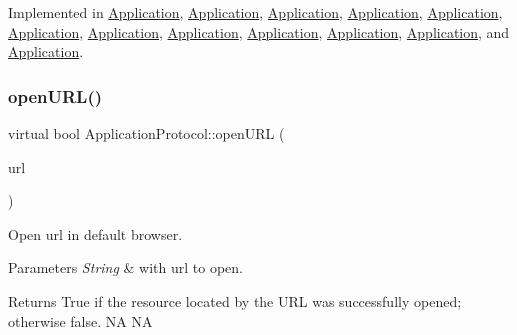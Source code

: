 Implemented in \hyperlink{classApplication_a13ccf5ab932de8a22255b56d085bed59}{Application}, \hyperlink{classApplication_a13ccf5ab932de8a22255b56d085bed59}{Application}, \hyperlink{classApplication_a13ccf5ab932de8a22255b56d085bed59}{Application}, \hyperlink{classApplication_a13ccf5ab932de8a22255b56d085bed59}{Application}, \hyperlink{classApplication_a13ccf5ab932de8a22255b56d085bed59}{Application}, \hyperlink{classApplication_a7efe73e7593e558749052d9decedf693}{Application}, \hyperlink{classApplication_a13ccf5ab932de8a22255b56d085bed59}{Application}, \hyperlink{classApplication_a72b67fcc1ab0875ee67a95167c76db61}{Application}, \hyperlink{classApplication_ab77675704c2cec7b0ed8413f4d556562}{Application}, \hyperlink{classApplication_a13ccf5ab932de8a22255b56d085bed59}{Application}, \hyperlink{classApplication_a72b67fcc1ab0875ee67a95167c76db61}{Application}, and \hyperlink{classApplication_a72b67fcc1ab0875ee67a95167c76db61}{Application}.

\mbox{\label{classApplicationProtocol_a152a977b301a90253ec5a6533b2e8e04}} 
\subsubsection{\texorpdfstring{open\+U\+R\+L()}{openURL()}\hspace{0.1cm}{\footnotesize\ttfamily [2/2]}}
{\footnotesize\ttfamily virtual bool Application\+Protocol\+::open\+U\+RL (\begin{DoxyParamCaption}\item[{const std\+::string \&}]{url }\end{DoxyParamCaption})\hspace{0.3cm}{\ttfamily [pure virtual]}}



Open url in default browser. 


\begin{DoxyParams}{Parameters}
{\em String} & with url to open. \\
\hline
\end{DoxyParams}
\begin{DoxyReturn}{Returns}
True if the resource located by the U\+RL was successfully opened; otherwise false.  NA  NA 
\end{DoxyReturn}


